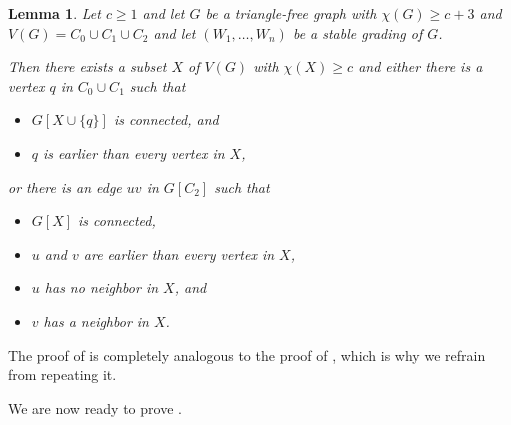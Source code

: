 \documentclass{article}
\newtheorem{lemma}[theorem]{Lemma}
\begin{document}
\begin{lemma}\label{lemma2:quasi}
    Let $c \geq 1$ and let $G$ be a triangle-free graph with $\chi(G) \geq c + 3$ and $V(G) = C_0 \cup C_1 \cup C_2$ and let $(W_1, \dots, W_n)$ be a stable grading of $G$.

    Then there exists a subset $X$ of $V(G)$ with $\chi(X) \geq c$ and either there is a vertex $q$ in $C_0 \cup C_1$ such that 
    \begin{itemize}
        \item $G[X \cup \{q\}]$ is connected, and
        \item $q$ is earlier than every vertex in $X$,
    \end{itemize}
    or there is an edge $uv$ in $G[C_2]$ such that 
    \begin{itemize}
        \item $G[X]$ is connected,
        \item $u$ and $v$ are earlier than every vertex in $X$,
        \item $u$ has no neighbor in $X$, and
        \item $v$ has a neighbor in $X$.
    \end{itemize}
\end{lemma}
The proof of  is completely analogous to the proof of , which is why we refrain from repeating it.

We are now ready to prove .
\end{document}
